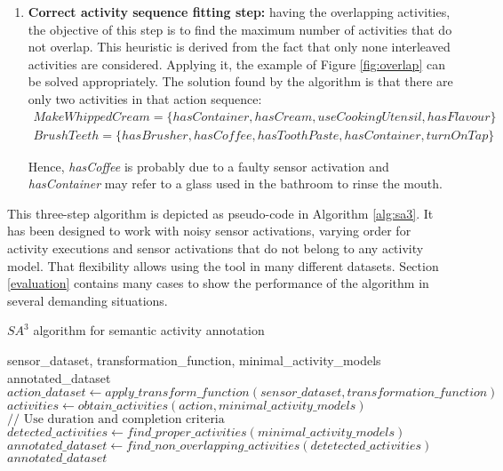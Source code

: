 \begin{enumerate}
\item \textbf{Correct activity sequence fitting step:} having the overlapping activities, the objective of this step is to find the maximum number of activities that do not overlap. This heuristic is derived from the fact that only none interleaved activities are considered. Applying it, the example of Figure \ref{fig:overlap} can be solved appropriately. The solution found by the algorithm is that there are only two activities in that action sequence:
\begin{equation*}
  \begin{split}   
  MakeWhippedCream = \{hasContainer, hasCream, useCookingUtensil, hasFlavour\} \\
  BrushTeeth = \{hasBrusher, hasCoffee, hasToothPaste, hasContainer, turnOnTap\} 
  \end{split}
 \end{equation*}  

Hence, \textit{hasCoffee} is probably due to a faulty sensor activation and \textit{hasContainer} may refer to a glass used in the bathroom to rinse the mouth. 
\end{enumerate}

This three-step algorithm is depicted as pseudo-code in Algorithm \ref{alg:sa3}. It has been designed to work with noisy sensor activations, varying order for activity executions and sensor activations that do not belong to any activity model. That flexibility allows using the tool in many different datasets. Section \ref{evaluation} contains many cases to show the performance of the algorithm in several demanding situations.

\begin{algorithm}
 \caption{$SA^3$ algorithm for semantic activity annotation}
 \label{alg:sa3}
 \begin{algorithmic}
 \REQUIRE sensor\_dataset, transformation\_function, minimal\_activity\_models
 \ENSURE annotated\_dataset
 \STATE $action\_dataset \leftarrow apply\_transform\_function(sensor\_dataset, transformation\_function)$
    \STATE $activities \leftarrow obtain\_activities(action, minimal\_activity\_models)$
  \ENDIF
    \STATE $// \text{ Use duration and completion criteria}$
    \STATE $detected\_activities \leftarrow find\_proper\_activities(minimal\_activity\_models)$
  \ENDFOR
 \ENDFOR
 \STATE $annotated\_dataset \leftarrow find\_non\_overlapping\_activities(detetected\_activities)$
 \RETURN $annotated\_dataset$
 \end{algorithmic}
\end{algorithm}
